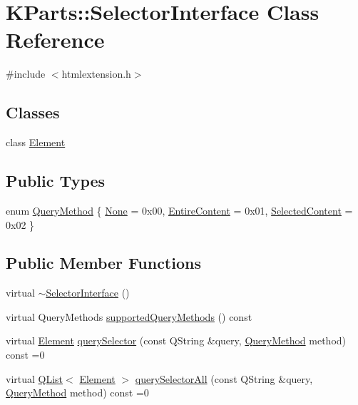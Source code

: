 \hypertarget{classKParts_1_1SelectorInterface}{\section{K\+Parts\+:\+:Selector\+Interface Class Reference}
\label{classKParts_1_1SelectorInterface}
}


{\ttfamily \#include $<$htmlextension.\+h$>$}

\subsection*{Classes}
\begin{DoxyCompactItemize}
\item 
class \hyperlink{classKParts_1_1SelectorInterface_1_1Element}{Element}
\end{DoxyCompactItemize}
\subsection*{Public Types}
\begin{DoxyCompactItemize}
\item 
enum \hyperlink{classKParts_1_1SelectorInterface_a90fe11660661a423709a52c91a969dce}{Query\+Method} \{ \hyperlink{classKParts_1_1SelectorInterface_a90fe11660661a423709a52c91a969dcea75dbd3a4d444c3a5f3ec94c2c20c2322}{None} = 0x00, 
\hyperlink{classKParts_1_1SelectorInterface_a90fe11660661a423709a52c91a969dceac39e4ace6e5f56e828ee81b7d1589d4d}{Entire\+Content} = 0x01, 
\hyperlink{classKParts_1_1SelectorInterface_a90fe11660661a423709a52c91a969dcea98dd4d0cb11e9068d9c017a6c666ce83}{Selected\+Content} = 0x02
 \}
\end{DoxyCompactItemize}
\subsection*{Public Member Functions}
\begin{DoxyCompactItemize}
\item 
virtual \hyperlink{classKParts_1_1SelectorInterface_a01573870d1fdd7143defe395acd359fd}{$\sim$\+Selector\+Interface} ()
\item 
virtual Query\+Methods \hyperlink{classKParts_1_1SelectorInterface_a324f1129034129fa347411c70c8c6e39}{supported\+Query\+Methods} () const 
\item 
virtual \hyperlink{classKParts_1_1SelectorInterface_1_1Element}{Element} \hyperlink{classKParts_1_1SelectorInterface_a704329531ffbb8abe80c97daaea01b4d}{query\+Selector} (const Q\+String \&query, \hyperlink{classKParts_1_1SelectorInterface_a90fe11660661a423709a52c91a969dce}{Query\+Method} method) const =0
\item 
virtual \hyperlink{classQList}{Q\+List}$<$ \hyperlink{classKParts_1_1SelectorInterface_1_1Element}{Element} $>$ \hyperlink{classKParts_1_1SelectorInterface_afe199d585952b4aeb1717122753616b3}{query\+Selector\+All} (const Q\+String \&query, \hyperlink{classKParts_1_1SelectorInterface_a90fe11660661a423709a52c91a969dce}{Query\+Method} method) const =0
\end{DoxyCompactItemize}


